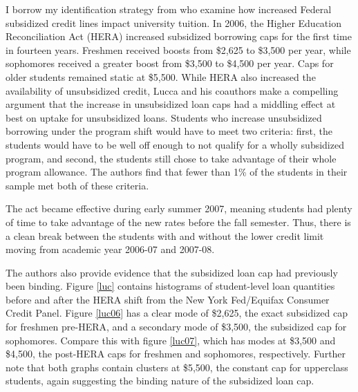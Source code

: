 \documentclass{article}
\begin{document}
	I borrow my identification strategy from \textcite{lucca2018} who examine how increased Federal subsidized credit lines impact university tuition. In 2006, the Higher Education Reconciliation Act (HERA) increased subsidized borrowing caps for the first time in fourteen years. Freshmen received boosts from \$2,625 to \$3,500 per year, while sophomores received a greater boost from \$3,500 to \$4,500 per year. Caps for older students remained static at \$5,500. While HERA also increased the availability of unsubsidized credit, Lucca and his coauthors make a compelling argument that the increase in unsubsidized loan caps had a middling effect at best on uptake for unsubsidized loans. Students who increase unsubsidized borrowing under the program shift would have to meet two criteria: first, the students would have to be well off enough to not qualify for a wholly subsidized program, and second, the students still chose to take advantage of their whole program allowance. The authors find that fewer than 1\% of the students in their sample met both of these criteria.
	
	The act became effective during early summer 2007, meaning students had plenty of time to take advantage of the new rates before the fall semester. Thus, there is a clean break between the students with and without the lower credit limit moving from academic year 2006-07 and 2007-08.
	
	The authors also provide evidence that the subsidized loan cap had previously been binding. Figure \ref{luc} contains histograms of student-level loan quantities before and after the HERA shift from the New York Fed/Equifax Consumer Credit Panel. Figure \ref{luc06} has a clear mode of \$2,625, the exact subsidized cap for freshmen pre-HERA, and a secondary mode of \$3,500, the subsidized cap for sophomores. Compare this with figure \ref{luc07}, which has modes at \$3,500 and \$4,500, the post-HERA caps for freshmen and sophomores, respectively. Further note that both graphs contain clusters at \$5,500, the constant cap for upperclass students, again suggesting the binding nature of the subsidized loan cap. 
	
\end{document}
